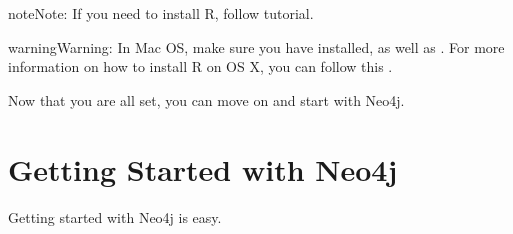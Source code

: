 \documentclass[letterpaper,10pt,english]{sphinxmanual}
\begin{document}
\begin{sphinxVerbatim}[commandchars=\\\{\}]
   
   
\end{sphinxVerbatim}

\begin{sphinxadmonition}{note}{Note:}
If you need to install R, follow  tutorial.
\end{sphinxadmonition}

\begin{sphinxadmonition}{warning}{Warning:}
In Mac OS, make sure you have  installed, as well as . For more information on how to install R on OS X, you can follow this .
\end{sphinxadmonition}

Now that you are all set, you can move on and start with Neo4j.


\section{Getting Started with Neo4j}
\label{\detokenize{intro/getting-started-with-neo4j:getting-started-with-neo4j}}\label{\detokenize{intro/getting-started-with-neo4j:id1}}\label{\detokenize{intro/getting-started-with-neo4j::doc}}
Getting started with Neo4j is easy.
\end{document}
